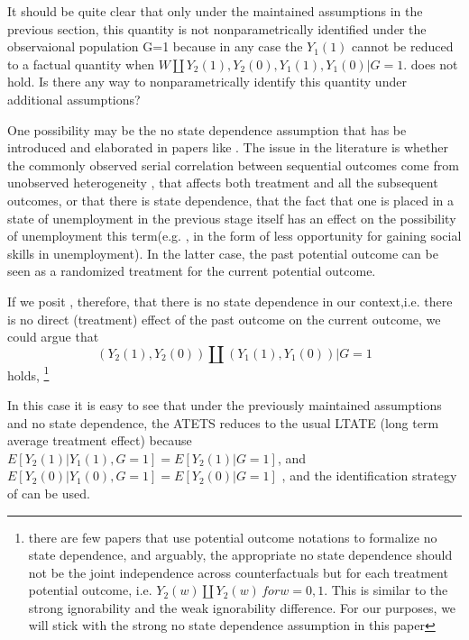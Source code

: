 \documentclass[uplatex,dvipdfmx]{jsarticle}
\begin{document}
It should be quite clear that only under the maintained assumptions in the previous section, this quantity is not nonparametrically identified under the observaional population G=1 because in any case the  $Y_1(1)$ cannot be reduced to a factual quantity when $ W \amalg Y_2(1) ,Y_2(0), Y_1(1), Y_1(0) |G=1$. does not hold.
Is there any way to nonparametrically identify this quantity under additional assumptions?

One possibility may be the no state dependence assumption that has be introduced and elaborated in papers like \cite{heckman1981heterogeneity,heckman1984method,torgovitsky2019nonparametric}. The issue in the literature is whether the commonly observed serial correlation between sequential outcomes come from unobserved heterogeneity , that affects both treatment and all the subsequent outcomes, or that there is state dependence, that the fact that one is placed in a state of unemployment in the previous stage itself has an effect on the possibility of unemployment this term(e.g. , in the form of less opportunity for gaining social skills in unemployment). In the latter case, the past potential outcome can be seen as a randomized treatment for the current potential outcome.

If we posit , therefore, that there is no state dependence in our context,i.e. there is no direct (treatment) effect of the past outcome on the current outcome, we could argue that 
\begin{equation}
    (Y_2(1), Y_2(0) ) \amalg (Y_1(1) , Y_1(0) ) | G=1 
\end{equation}
holds, \footnote{  there are few papers that use potential outcome notations to formalize no state dependence, and arguably, the appropriate no state dependence should not be the joint independence across counterfactuals but for each treatment potential outcome, i.e. $ Y_2(w) \amalg Y_2(w) \, for w= 0,1 $. This is similar to the strong ignorability \cite{rosenbaum1983central} and the weak ignorability \cite{imbens2015causal} difference. For our purposes, we will stick with the strong no state dependence assumption in this paper }   

In this case it is easy to see that under the previously maintained assumptions and no state dependence, the ATETS reduces to the usual LTATE (long term average treatment effect) because $E[ Y_2(1) | Y_1(1), G=1 ] = E[ Y_2(1) | G=1] $, and $ E[Y_2(0) | Y_1(0) , G=1] =  E[Y_2(0) |  G=1]$   , and the identification strategy of \cite{athey2020combining} can be used. 
\end{document}
